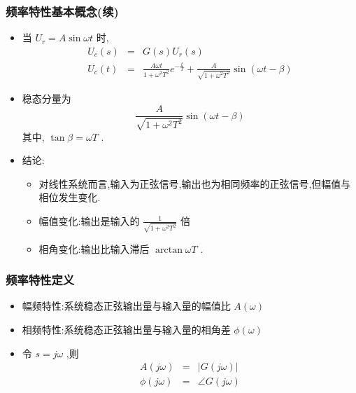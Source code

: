 \documentclass[table]{beamer}
\begin{document}
\begin{frame}
\frametitle{频率特性基本概念(续)}
\label{sec-1-3}

\begin{itemize}
\item <2->当 $U_r=A\sin\omega t$ 时,
        \begin{eqnarray*}
        U_c(s) & =& G(s)U_r(s)\\
        U_c(t) &=& \frac{A\omega t}{1+\omega^2 T^2}e^{-\frac{t}{T}}+\frac{A}{\sqrt{1+\omega^2 T^2}}\sin(\omega t-\beta)
        \end{eqnarray*}
\item <3->稳态分量为 
      \[\frac{A}{\sqrt{1+\omega^2 T^2}}\sin(\omega t-\beta)\]
       其中, $\tan\beta=\omega T$ .
\item <4->结论:
\begin{itemize}
\item <4->对线性系统而言,输入为正弦信号,输出也为相同频率的正弦信号,但幅值与相位发生变化.
\item <5->幅值变化:输出是输入的  $\frac{1}{\sqrt{1+\omega^2 T^2}}$  倍
\item <6->相角变化:输出比输入滞后  $\arctan \omega T$  .
\end{itemize}
\end{itemize}
\end{frame}
\begin{frame}
\frametitle{频率特性定义}
\label{sec-1-4}

\begin{itemize}
\item <2->幅频特性:系统稳态正弦输出量与输入量的幅值比  $A(\omega)$
\item <3->相频特性:系统稳态正弦输出量与输入量的相角差  $\phi(\omega)$
\item <4->令  $s=j\omega$  ,则
      \begin{eqnarray*}
      A(j\omega)&=&|G(j\omega)|  \\
      \phi(j\omega) &=& \angle G(j\omega)
      \end{eqnarray*}
\end{itemize}
\end{frame}
\end{document}
